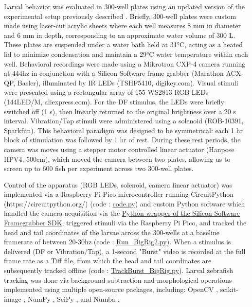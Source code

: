 \documentclass[9.5pt,lineno]{RandlettLab_elife}
\begin{document}
{Larval behavior was evaluated in 300-well plates using an updated version of the experimental setup previously described \citep{Randlett2019-fj,Lamire2023-he}. 
Briefly, 300-well plates were custom made using laser-cut acrylic sheets where each well measures 8 mm in diameter and 6 mm in depth, corresponding to an approximate water volume of 300 \textmu L.
These plates are suspended under a water bath held at 31°C, acting as a heated lid to minimize condensation and maintain a 29°C water temperature within each well. 
Behavioral recordings were made using a Mikrotron CXP-4 camera running at 444hz in conjunction with a Silicon Software frame grabber (Marathon ACX-QP, Basler), illuminated by IR LEDs (TSHF5410, digikey.com). Visual stimuli were presented using a rectangular array of 155 WS2813 RGB LEDs (144LED/M, aliexpress.com). 
For the DF stimulus, the LEDs were briefly switched off (1 s), then linearly returned to the original brightness over a 20 s interval. 
Vibration/Tap stimuli were administered using a solenoid (ROB-10391, Sparkfun). 
This behavioral paradigm was designed to be symmetrical: each 1 hr block of stimulation was followed by 1 hr of rest. 
During these rest periods, the camera was moves using a stepper motor controlled linear actuator (Hanpose HPV4, 500cm), which moved the camera between two plates, allowing us to screen up to 600 fish per experiment across two 300-well plates. 

Control of the apparatus (RGB LEDs, solenoid, camera linear actuator) was implemented via a Raspberry Pi Pico microcontroller running  CircuitPython (https://circuitpython.org/) (code : \href{https://github.com/owenrandlett/2025_HabEstrogen/tree/main/code/RigControl/PiPicro}{code.py}) and custom Python software which handled the camera acquisition via the \href{https://docs.baslerweb.com/frame-grabbers/python-wrapper}{Python wrapper of the Silicon Software Framegrabber SDK}, triggered stimuli via the Raspberry Pi Pico, and tracked the head and tail coordinates of the larvae across the 300-wells at a baseline framerate of between 20-30hz  (code : \href{https://github.com/owenrandlett/2025_HabEstrogen/blob/main/code/RigControl/Run_BigRig2.py}{Run\_BigRig2.py}). 
When a stimulus is delivered (DF or Vibration/Tap), a 1-second "Burst" video is recorded at the full frame rate as a Tiff file, from which the head and tail coordinates are subsequently tracked offline (code : \href{https://github.com/owenrandlett/2025_HabEstrogen/blob/main/code/RigControl/TrackBurst_BigRig.py}{TrackBurst\_BigRig.py}).
Larval zebrafish tracking was done via background subtraction and morphological operations implemented using multiple open-source packages, including: 
OpenCV \citep{Bradski2000-qo}, 
scikit-image \citep{van2014scikit}, 
NumPy \citep{Harris2020-bg}, 
SciPy \citep{Virtanen2020-sz}, 
and Numba \citep{lam2015numba}.


}
\end{document}
